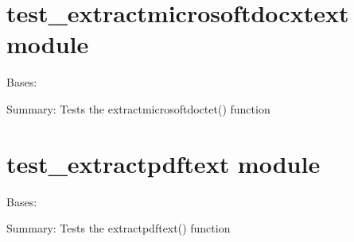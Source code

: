\documentclass[letterpaper,10pt,english]{sphinxmanual}
\begin{document}
\section{test\_extractmicrosoftdocxtext module}
\label{\detokenize{unit_tests:module-unit_tests.test_extractmicrosoftdocxtext}}\label{\detokenize{unit_tests:test-extractmicrosoftdocxtext-module}}

\begin{fulllineitems}
\label{\detokenize{unit_tests:unit_tests.test_extractmicrosoftdocxtext.TestExtractmicrosoftdocxtext}}
Bases: 

\begin{fulllineitems}
\label{\detokenize{unit_tests:unit_tests.test_extractmicrosoftdocxtext.TestExtractmicrosoftdocxtext.test_extractmicrosoftdocxtext}}
Summary: Tests the extractmicrosoftdoctet() function

\end{fulllineitems}


\end{fulllineitems}



\section{test\_extractpdftext module}
\label{\detokenize{unit_tests:test-extractpdftext-module}}\label{\detokenize{unit_tests:module-unit_tests.test_extractpdftext}}

\begin{fulllineitems}
\label{\detokenize{unit_tests:unit_tests.test_extractpdftext.TestExtractpdftext}}
Bases: 

\begin{fulllineitems}
\label{\detokenize{unit_tests:unit_tests.test_extractpdftext.TestExtractpdftext.test_extractpdftext}}
Summary: Tests the extractpdftext() function

\end{fulllineitems}


\end{fulllineitems}
\end{document}
